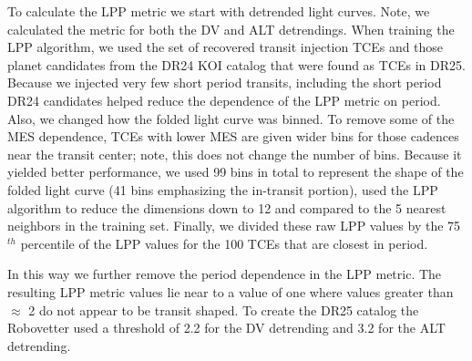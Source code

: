 To calculate the LPP metric we start with detrended \kepler{} light curves. Note, we calculated the metric for both the DV and ALT detrendings. When training the LPP algorithm, we used the set of recovered transit injection TCEs and those planet candidates from the DR24 KOI catalog \citep{Coughlin2016} that were found as TCEs in DR25.  Because we injected very few short period transits, including the short period DR24 candidates helped reduce the dependence of the LPP metric on period.  Also, we changed how the folded light curve was binned. To remove some of the MES dependence, TCEs with lower MES are given wider bins for those cadences near the transit center; note, this does not change the number of bins. Because it yielded better performance, we used 99 bins in total to represent the shape of the folded light curve (41 bins emphasizing the in-transit portion), used the LPP algorithm to reduce the dimensions down to 12 and compared to the 5 nearest neighbors in the training set.  Finally, we divided these raw LPP values by the  75$^{th}$ percentile of the LPP values for the 100 TCEs that are closest in period. 

In this way we further remove the period dependence in the LPP metric.  The resulting LPP metric values lie near to a value of one where values greater than $\approx$ 2 do not appear to be transit shaped.  To create the DR25 catalog the Robovetter used a threshold of 2.2 for the DV detrending and 3.2 for the ALT detrending.




